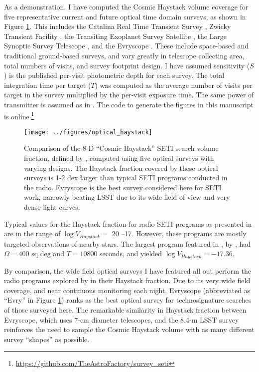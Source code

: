 \documentclass[twocolumn]{aastex62}
\begin{document}
As a demonstration, I have computed the Cosmic Haystack volume coverage for five representative current and future optical time domain surveys, as shown in Figure \ref{fig:hay}. This includes the Catalina Real Time Transient Survey \citep[CRTS;][]{catalina}, Zwicky Transient Facility \citep[ZTF;][]{bellm2014}, the Transiting Exoplanet Survey Satellite \citep[TESS;][]{tess}, the Large Synoptic Survey Telescope \citep[LSST;][]{lsst}, and the Evryscope \citep{law2015}. These include space-based and traditional ground-based surveys, and vary greatly in telescope collecting area, total numbers of visits, and survey footprint design. 
I have assumed sensitivity ($S$) is the published per-visit photometric depth for each survey. The total integration time per target ($T$) was computed as the average number of visits per target in the survey multiplied by the per-visit exposure time. The same power of transmitter is assumed as in \citet{wright2018c}. 
The code to generate the figures in this manuscript is online.\footnote{\url{https://github.com/TheAstroFactory/survey_seti}}


\begin{figure}[]
\centering
\texttt{[image: ../figures/optical\_haystack]}
\caption{
Comparison of the 8-D ``Cosmic Haystack'' SETI search volume fraction, defined by \citet{wright2018c}, computed using five optical surveys with varying designs. The Haystack fraction covered by these optical surveys is 1-2 dex larger than typical SETI programs conducted in the radio.
Evryscope \citet{law2015} is the best survey considered here for SETI work, narrowly beating LSST due to its wide field of view and very dense light curves.}
\label{fig:hay}
\end{figure}


Typical values for the Haystack fraction for radio SETI programs as presented in \citet{wright2018c}  are in the range of $\log V_{Haystack} = $ 20 --17. However, these programs are mostly targeted observations of nearby stars. The largest program featured in \citet{wright2018c}, by \citet{tingay2018}, had $\Omega=400$ sq deg and $T=10800$ seconds, and yielded $\log V_{Haystack} =  -17.36$.

By comparison, the wide field optical surveys I have featured all out perform the radio programs explored by \citet{wright2018c} in their Haystack fraction.
Due to its very wide field coverage, and near continuous monitoring each night, Evryscope (abbreviated as ``Evry'' in Figure \ref{fig:hay}) ranks as the best optical survey for technosignature searches of those surveyed here. The remarkable similarity in Haystack fraction between Evryscope, which uses 7-cm diameter telescopes, and the 8.4-m LSST survey reinforces the need to sample the Cosmic Haystack volume with as many different survey ``shapes'' as possible.
\end{document}
